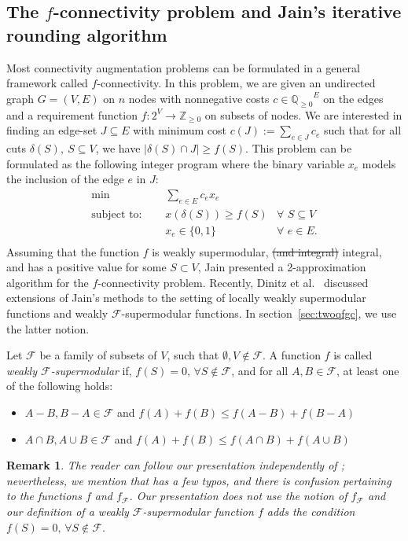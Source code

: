 \documentclass[11pt]{article}
\newtheorem*{remark}{Remark}
\newcommand{\Q}{\ensuremath{\mathbb Q}}
\newcommand{\Qp}{\ensuremath{\Q_{\geq 0}}}
\newcommand{\Zint}{\ensuremath{\mathbb Z}}
\newcommand{\Zp}{\ensuremath{\Zint_{\geq 0}}}
\newcommand{\F}{\mathcal{F}}
\newcommand{\J}{{J}}
\begin{document}
\subsection*{The $f$-connectivity problem and Jain's iterative rounding algorithm}
{
Most connectivity augmentation problems can be formulated in
a general framework called $f$-connectivity. In this problem, we
are given an undirected graph $G = (V,E)$ on $n$ nodes with
nonnegative costs $c \in \Qp^E$ on the edges and a requirement
function $f:2^V\to\Zp$ on subsets of nodes.
We are interested in finding an edge-set $\J \subseteq E$ with minimum
cost $c(\J) := \sum_{e \in \J} c_e$ such that for all cuts
$\delta(S),\ S \subseteq V$, we have
$|\delta(S) \cap \J| \geq f(S)$.
This problem can be formulated as the following integer program
where the binary variable $x_e$ models the inclusion of the edge $e$ in $\J$:
\begin{align*} \tag{IP: $f$-connectivity}
\label{eq:fconnectivityIP}
\min \quad \qquad		& \quad \sum_{e \in E} c_e x_e 		& \\
\text{subject to: } 	& \quad x( \delta(S) ) \geq f(S) 	& \forall \, \, S \subseteq V \\
					& \quad x_e \in \{0,1\} & \forall \, \, e \in E. \\
\end{align*}
Assuming that the function $f$ is weakly supermodular, \st{(and integral)} {integral, and has a positive value for some $S\subset{V}$},
Jain \cite{Jain01} presented a 2-approximation algorithm for the $f$-connectivity problem.
Recently, Dinitz et al.\ \cite{DKK22,DKKN23} discussed extensions of Jain's methods to
the setting of locally weakly supermodular functions and weakly
{$\F$}-supermodular functions.  In section~\ref{sec:twoqfgc}, we
use the latter notion. 


Let $\F$ be a family of subsets of $V$, such that $\emptyset,V \notin \F$.
A function $f$ is called \textit{weakly $\F$-supermodular} if,
{ $f(S)=0,\,\forall{S\not\in\F}$, and } for
all $A,B \in \F$, at least one of the following holds:
\begin{itemize}
    \item $A - B, B - A \in \F$ and $f(A) + f(B) \leq f(A - B) + f(B - A)$
    \item $A \cap B, A \cup B \in \F$ and $f(A) + f(B) \leq f(A \cap B) + f(A \cup B)$
\end{itemize}


\begin{remark}
The reader can follow our presentation independently of \cite{DKKN23}; nevertheless, we mention that \cite{DKKN23} has a few typos, and there is confusion pertaining to the functions $f$ and $f_{\F}$. Our presentation does not use the notion of $f_{\F}$ and our definition of a weakly $\F$-supermodular function $f$ adds the condition $f(S)=0,\,\forall{S\not\in\F}$.
\end{remark}


}
\end{document}
